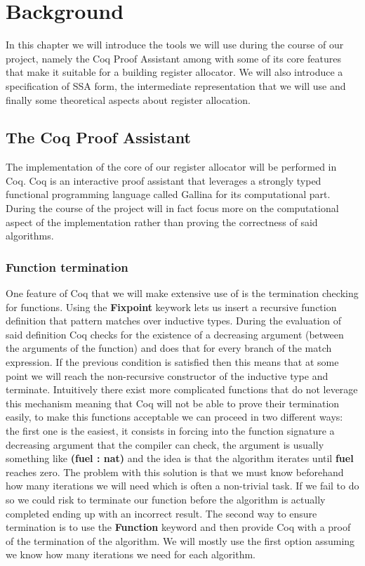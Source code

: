 \chapter{Background}
\label{cha:background}
In this chapter we will introduce the tools we will use during the course of our project, namely the Coq Proof Assistant among with some of its core features that make it suitable for a building register allocator. We will also introduce a specification of SSA form, the intermediate representation that we will use and finally some theoretical aspects about register allocation.

\section{The Coq Proof Assistant}
The implementation of the core of our register allocator will be performed in Coq. Coq is an interactive proof assistant that leverages a strongly typed functional programming language called Gallina for its computational part. 
During the course of the project will in fact focus more on the computational aspect of the implementation rather than proving the correctness of said algorithms.

\subsection{Function termination}
One feature of Coq that we will make extensive use of is the termination checking for functions. Using the \textbf{Fixpoint} keywork lets us insert a recursive function definition that pattern matches over inductive types.
During the evaluation of said definition Coq checks for the existence of a decreasing argument (between the arguments of the function) and does that for every branch of the match expression. If the previous condition is satisfied then this means that at some point we will reach the non-recursive constructor of the inductive type and terminate.
Intuitively there exist more complicated functions that do not leverage this mechanism meaning that Coq will not be able to prove their termination easily, to make this functions acceptable we can proceed in two different ways:
the first one is the easiest, it consists in forcing into the function signature a decreasing argument that the compiler can check, the argument is usually something like \textbf{(fuel : nat)} and the idea is that the algorithm iterates until \textbf{fuel} reaches zero. The problem with this solution is that we must know beforehand how many iterations we will need which is often a non-trivial task. If we fail to do so we could risk to terminate our function before the algorithm is actually completed ending up with an incorrect result.
The second way to ensure termination is to use the \textbf{Function} keyword and then provide Coq with a proof of the termination of the algorithm.
We will mostly use the first option assuming we know how many iterations we need for each algorithm.

